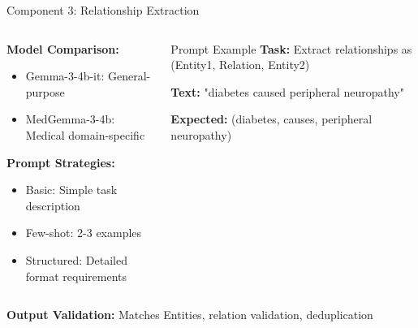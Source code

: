 \documentclass[aspectratio=169, 11pt]{beamer}
\begin{document}
\begin{frame}{Component 3: Relationship Extraction}
    \begin{columns}
        \begin{column}{0.5\textwidth}
            \textbf{Model Comparison:}
            \begin{itemize}
                \item Gemma-3-4b-it: General-purpose
                \item MedGemma-3-4b: Medical domain-specific
            \end{itemize}
            
            \textbf{Prompt Strategies:}
            \begin{itemize}
                \item Basic: Simple task description
                \item Few-shot: 2-3 examples
                \item Structured: Detailed format requirements
            \end{itemize}
        \end{column}
        \begin{column}{0.5\textwidth}
            \begin{exampleblock}{Prompt Example}
                \footnotesize
                \textbf{Task:} Extract relationships as (Entity1, Relation, Entity2)
                
                \textbf{Text:} "diabetes caused peripheral neuropathy"
                
                \textbf{Expected:} (diabetes, causes, peripheral neuropathy)
            \end{exampleblock}
        \end{column}
    \end{columns}
    
    \vspace{0.5cm}
    \textbf{Output Validation:} Matches Entities, relation validation, deduplication
\end{frame}
\end{document}
